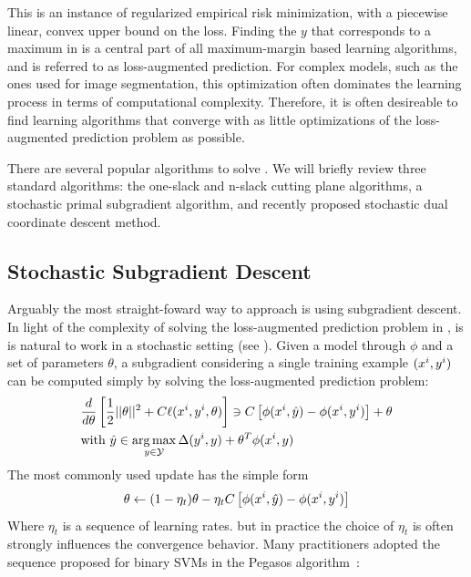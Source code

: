 This is an instance of regularized empirical risk minimization, with a
piecewise linear, convex upper bound on the loss. 
Finding the $y$ that corresponds to a maximum in  is
a central part of all maximum-margin based learning algorithms, and is referred to
as loss-augmented prediction. For complex models, such as the ones used for
image segmentation, this optimization often dominates the learning process in
terms of computational complexity.
Therefore, it is often desireable to find learning algorithms that converge with
as little optimizations of the loss-augmented prediction problem as possible.

There are several popular algorithms to solve . We
will briefly review three standard algorithms: the one-slack and n-slack
cutting plane algorithms, a stochastic primal subgradient algorithm, and
recently proposed stochastic dual coordinate descent method.

\subsection{Stochastic Subgradient Descent}
Arguably the most straight-foward way to approach  is
using subgradient descent.  In light of the complexity of solving the
loss-augmented prediction problem in , is is natural
to work in a stochastic setting (see \citet{ratliff2007online}).
Given a model through $\phi$ and a set of parameters $\theta$, a subgradient
considering a single training example $(x^{i}, y^{i})$
can be computed simply by solving the loss-augmented prediction problem:
\begin{align}
    &\frac{d}{d\theta} \left [ \frac{1}{2} ||\theta||^2 + C \ell(x^{i}, y^{i}, \theta) \right ] \ni C\left [ \phi(x^{i}, \hat{y}) - \phi(x^{i}, y^{i}) \right]+ \theta\\
    &\text{with }\hat{y} \in \operatorname*{arg\,max}_{y \in \mathcal{Y}} \Delta(y^{i}, y) + \theta^T \phi(x^{i}, y)
\end{align}
The most commonly used update has the simple form
\begin{equation}
    \theta \leftarrow (1 - \eta_t) \theta - \eta_t C \left [\phi(x^{i}, \hat{y}) - \phi(x^{i}, y^{i})\right]
\end{equation}
Where $\eta_t$ is a sequence of learning rates.
but in practice the choice of $\eta_t$ is often strongly influences the convergence behavior.
Many practitioners adopted the sequence proposed for binary SVMs in the Pegasos algorithm~\citep{pegasos}:

